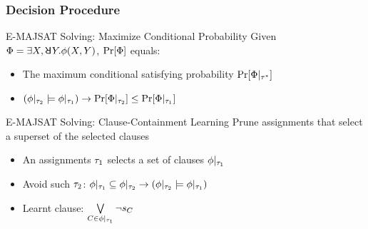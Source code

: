 \begin{frame}
    \frametitle{Decision Procedure}
    \begin{block}{E-MAJSAT Solving: Maximize Conditional Probability}
        Given $\Qf=\exists X,\random{} Y.\pf(X,Y)$, $\Pr[\Phi]$ equals:
        \pause
        \begin{itemize}
            \item The maximum conditional satisfying probability $\Pr[\Phi|_{\tau^*}]$
                  \pause
            \item $(\phi|_{\tau_2}\models\phi|_{\tau_1})\rightarrow\Pr[\Phi|_{\tau_2}]\leq\Pr[\Phi|_{\tau_1}]$
                  \pause
        \end{itemize}
    \end{block}
    \begin{block}{E-MAJSAT Solving: Clause-Containment Learning}
        Prune assignments that select a superset of the selected clauses
        \pause
        \begin{itemize}
            \item An assignments $\tau_1$ selects a set of clauses $\phi|_{\tau_1}$
                  \pause
            \item Avoid such $\tau_2$: $\phi|_{\tau_1}\subseteq\phi|_{\tau_2}\rightarrow(\phi|_{\tau_2}\models\phi|_{\tau_1})$
                  \pause
            \item Learnt clause: $\bigvee\limits_{C\in\phi|_{\tau_1}}\lnot s_{C}$
        \end{itemize}
    \end{block}
\end{frame}

